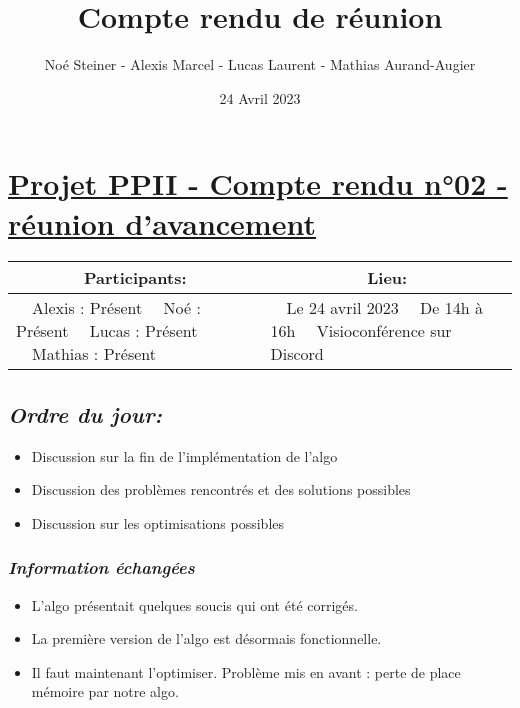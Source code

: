 \documentclass[french,a4paper]{article}
\author{Noé Steiner - Alexis Marcel - Lucas Laurent - Mathias Aurand-Augier}
\date{24 Avril 2023}
\newcommand{\tabitem}{\textbullet~~}\title{Compte rendu de réunion}
\begin{document}
\maketitle

\section*{\underline{Projet PPII - Compte rendu n°02 - réunion d'avancement}}

\begin{table}[!htb]
  \centering
  \begin{tabular}{| p{7cm} | p{7cm} |}
    \hline
    \multicolumn{1}{|c|}{ Participants:} & \multicolumn{1}{c|}{Lieu:} \\
    \hline
    \tabitem Alexis : Présent\newline
    \tabitem Noé : Présent\newline
    \tabitem Lucas : Présent\newline
    \tabitem Mathias : Présent                      &
    \tabitem Le 24 avril 2023\newline
    \tabitem De 14h à 16h\newline
    \tabitem Visioconférence sur Discord                                         \\
    \hline
  \end{tabular}
\end{table}

\subsection*{\textit{Ordre du jour:}}

\begin{itemize}
    \item Discussion sur la fin de l'implémentation de l'algo
    \item Discussion des problèmes rencontrés et des solutions possibles
    \item Discussion sur les optimisations possibles
\end{itemize}

\subsubsection*{\textit{Information échangées}}
\begin{itemize}
  \item L'algo présentait quelques soucis qui ont été corrigés.
  \item La première version de l'algo est désormais fonctionnelle.
  \item Il faut maintenant l'optimiser. Problème mis en avant : perte de place mémoire par notre algo.
\end{itemize}
\end{document}
